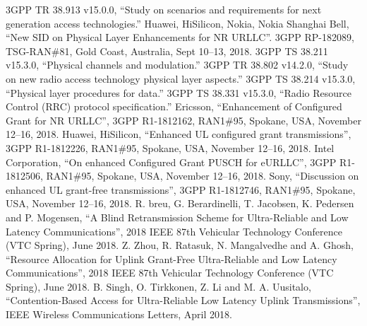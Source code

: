 \documentclass[conference]{IEEEtran}
\begin{document}
\begin{thebibliography}{00}
 3GPP TR 38.913 v15.0.0, ``Study on scenarios and requirements for next generation access technologies.''
 Huawei, HiSilicon, Nokia, Nokia Shanghai Bell, ``New SID on Physical Layer Enhancements for NR URLLC''. 3GPP RP-182089, TSG-RAN\#81, Gold Coast, Australia, Sept 10--13, 2018.
 3GPP TS 38.211 v15.3.0, ``Physical channels and modulation.''
 3GPP TR 38.802 v14.2.0, ``Study on new radio access technology physical layer aspects.''
 3GPP TS 38.214 v15.3.0, ``Physical layer procedures for data.''
 3GPP TS 38.331 v15.3.0, ``Radio Resource Control (RRC) protocol specification.''
 Ericsson, ``Enhancement of Configured Grant for NR URLLC'', 3GPP R1-1812162, RAN1\#95, Spokane, USA, November 12--16, 2018.
 Huawei, HiSilicon, ``Enhanced UL configured grant transmissions'', 3GPP R1-1812226, RAN1\#95, Spokane, USA, November 12--16, 2018.
 Intel Corporation, ``On enhanced Configured Grant PUSCH for eURLLC'', 3GPP R1-1812506, RAN1\#95, Spokane, USA, November 12--16, 2018.
 Sony, ``Discussion on enhanced UL grant-free transmissions'', 3GPP R1-1812746, RAN1\#95, Spokane, USA, November 12--16, 2018.
 R. breu, G. Berardinelli, T. Jacobsen, K. Pedersen and P. Mogensen, ``A Blind Retransmission Scheme for Ultra-Reliable and Low Latency Communications'', 2018 IEEE 87th Vehicular Technology Conference (VTC Spring), June 2018.
 Z. Zhou, R. Ratasuk, N. Mangalvedhe and A. Ghosh, ``Resource Allocation for Uplink Grant-Free Ultra-Reliable and Low Latency Communications'', 2018 IEEE 87th Vehicular Technology Conference (VTC Spring), June 2018.
 B. Singh, O. Tirkkonen, Z. Li and M. A. Uusitalo, ``Contention-Based Access for Ultra-Reliable Low Latency Uplink Transmissions'',  IEEE Wireless Communications Letters, April 2018.

\end{thebibliography}
\vspace{12pt}
\end{document}
